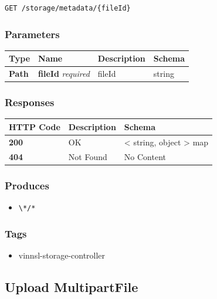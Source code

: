 \begin{verbatim}
GET /storage/metadata/{fileId}
\end{verbatim}

\subsubsection{Parameters}\label{parameters-17}

\begin{longtable}[]{@{}llll@{}}
\toprule
Type & Name & Description & Schema\tabularnewline
\midrule
\endhead
\textbf{Path} & \textbf{fileId} \emph{required} & fileId &
string\tabularnewline
\bottomrule
\end{longtable}

\subsubsection{Responses}\label{responses-20}

\begin{longtable}[]{@{}lll@{}}
\toprule
HTTP Code & Description & Schema\tabularnewline
\midrule
\endhead
\textbf{200} & OK & \textless{} string, object \textgreater{}
map\tabularnewline
\textbf{404} & Not Found & No Content\tabularnewline
\bottomrule
\end{longtable}

\subsubsection{Produces}\label{produces-20}

\begin{itemize}
\tightlist
\item
  \texttt{\textbackslash{}*/*}
\end{itemize}

\subsubsection{Tags}\label{tags-20}

\begin{itemize}
\tightlist
\item
  vinnsl-storage-controller
\end{itemize}

\subsection{Upload MultipartFile}\label{upload-multipartfile}

